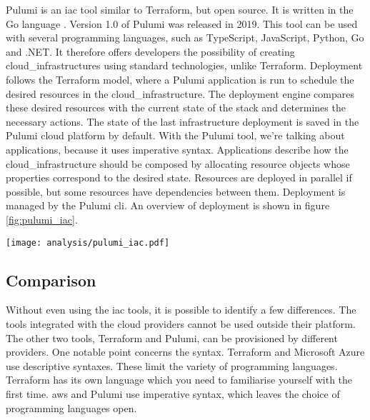 Pulumi is an \acrshort{iac} tool similar to Terraform, but open source. It is written in the Go language \cite{pulumi_github}. Version 1.0 of Pulumi was released in 2019. This tool can be used with several programming languages, such as TypeScript, JavaScript, Python, Go and .NET. It therefore offers developers the possibility of creating \glspl{cloud_infrastructure} using standard technologies, unlike Terraform. Deployment follows the Terraform model, where a Pulumi application is run to schedule the desired resources in the \gls{cloud_infrastructure}. The deployment engine compares these desired resources with the current state of the stack and determines the necessary actions. The state of the last infrastructure deployment is saved in the Pulumi \Gls{cloud} platform by default. With the Pulumi tool, we're talking about applications, because it uses imperative syntax. Applications describe how the \gls{cloud_infrastructure} should be composed by allocating resource objects whose properties correspond to the desired state. Resources are deployed in parallel if possible, but some resources have dependencies between them. Deployment is managed by the Pulumi \acrshort{cli}. An overview of deployment is shown in figure \ref{fig:pulumi_iac}. \cite{iac_tools}
\begin{center}
    \begingroup
    \texttt{[image: analysis/pulumi\_iac.pdf]}
    \label{fig:pulumi_iac}
    \endgroup
\end{center}

\subsection{Comparison}
Without even using the \acrshort{iac} tools, it is possible to identify a few differences. The tools integrated with the \gls{cloud} providers cannot be used outside their platform. The other two tools, Terraform and Pulumi, can be provisioned by different providers. One notable point concerns the syntax. Terraform and Microsoft Azure use descriptive syntaxes. These limit the variety of programming languages. Terraform has its own language which you need to familiarise yourself with the first time. \gls{aws} and Pulumi use imperative syntax, which leaves the choice of programming languages open.

